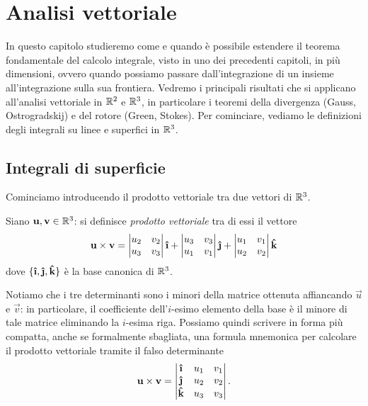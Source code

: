 \chapter{Analisi vettoriale}
In questo capitolo studieremo come e quando è possibile estendere il teorema fondamentale del calcolo integrale, visto in uno dei precedenti capitoli, in più dimensioni, ovvero quando possiamo passare dall'integrazione di un insieme all'integrazione sulla sua frontiera.
Vedremo i principali risultati che si applicano all'analisi vettoriale in $\mathbb{R}^2$ e $\mathbb{R}^3$, in particolare i teoremi della divergenza (Gauss, Ostrogradskij) e del rotore (Green, Stokes).
Per cominciare, vediamo le definizioni degli integrali su linee e superfici in $\mathbb{R}^3$.

\section{Integrali di superficie}
Cominciamo introducendo il prodotto vettoriale tra due vettori di $\mathbb{R}^3$.
\begin{definizione} \label{d:prodotto-vettoriale}
	Siano $\mathbf{u},\mathbf{v}\in\mathbb{R}^3$: si definisce \emph{prodotto vettoriale} tra di essi il vettore
	\begin{equation}
		\vec u\times\vec v=
		\begin{vmatrix}
			u_2& v_2\\u_3&v_3
		\end{vmatrix}\ii+
		\begin{vmatrix}
			u_3&v_3\\u_1&v_1
		\end{vmatrix}\jj+
		\begin{vmatrix}
			u_1&v_1\\u_2&v_2
		\end{vmatrix}\kk
		\label{eq:prodotto-vettoriale}
	\end{equation}
	dove $\{\ii,\jj,\kk\}$ è la base canonica di $\mathbb{R}^3$.
\end{definizione}
Notiamo che i tre determinanti sono i minori della matrice ottenuta affiancando $\vec u$ e $\vec v$: in particolare, il coefficiente dell'$i$-esimo elemento della base è il minore di tale matrice eliminando la $i$-esima riga.
Possiamo quindi scrivere in forma più compatta, anche se formalmente sbagliata, una formula mnemonica per calcolare il prodotto vettoriale tramite il falso determinante
\begin{equation*}
	\vec u\times\vec v=
	\begin{vmatrix}
		\ii& u_1& v_1\\
		\jj& u_2& v_2\\
		\kk& u_3& v_3
	\end{vmatrix}.
\end{equation*}
